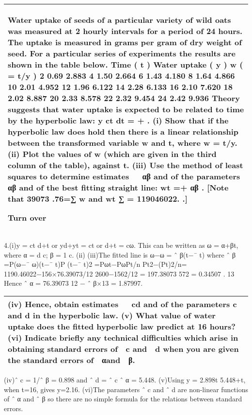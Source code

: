 \documentclass[a4paper,12pt]{article}
\begin{document}
\begin{table}[ht!]
 \centering
 \begin{tabular}{|p{15cm}|}
 \hline  
 Water uptake of seeds of a particular variety of wild oats was measured at 2 hourly intervals for a period of 24 hours. The uptake is measured in grams per gram of dry weight of seed. For a particular series of experiments the results are shown in the table below.
Time ( t ) Water uptake ( y )
w ( = t/y )
2 0.69 2.883 4 1.50 2.664 6 1.43 4.180 8 1.64 4.866 10 2.01 4.952 12 1.96 6.122 14 2.28 6.133 16 2.10 7.620 18 2.02 8.887 20 2.33 8.578 22 2.32 9.454 24 2.42 9.936
Theory suggests that water uptake is expected to be related to time by the hyperbolic law:
y
ct dt
=
+
.
(i) Show that if the hyperbolic law does hold then there is a linear relationship between the transformed variable  w  and  t, where w =  t/y.
(ii) Plot the values of  w  (which are given in the third column of the table), against t.
(iii) Use the method of least squares to determine estimates   αβ and of the parameters αβ and of the best fitting straight line: wt =+ αβ .
 [Note that 39073 .76=∑ w and wt ∑ = 119046022. .]

Turn over\\ \hline
  \end{tabular}
\end{table}

4.(i)y = ct d+t or yd+yt = ct or d+t = cω. This can be written as ω = α+βt, where α = d c; β = 1 c. (ii)
(iii)The ﬁtted line is ω−ω = ˆ β(t−¯ t) where ˆ β =P(ω−¯ ω)(t−¯ t)P (t−¯ t)2 =Pωt−PωPt/n Pt2−(Pt)2/n= 1190.46022−156×76.39073/12 2600−1562/12 = 197.38073 572 = 0.34507 .
13
Hence ˆ α = 76.39073 12 − ˆ β×13 = 1.87997.

\begin{table}[ht!]
 \centering
 \begin{tabular}{|p{15cm}|}
 \hline  
(iv) Hence, obtain estimates   cd and of the parameters c and d in the hyperbolic law.
(v) What value of water uptake does the fitted hyperbolic law predict at 16 hours?
(vi) Indicate briefly any technical difficulties which arise in obtaining standard errors of  c and  d when you are given the standard errors of  αand  β.
\\ \hline
  \end{tabular}
\end{table}

\newpage
 (iv)ˆ c = 1/ˆ β = 0.898 and ˆ d = ˆ c ˆ α = 5.448. (v)Using y = 2.898t 5.448+t, when t=16, gives y=2.16. (vi)The parameters ˆ c and ˆ d are non-linear functions of ˆ α and ˆ β so there are no simple formula for the relations between standard errors.
\end{document}
